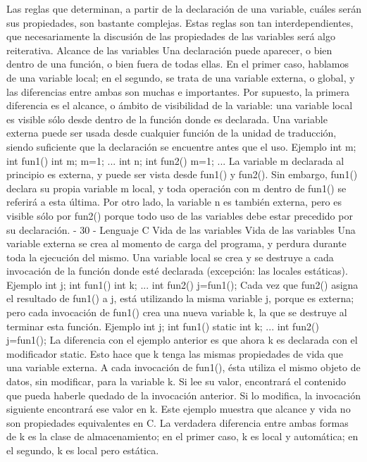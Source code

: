 Las reglas que determinan, a partir de la declaración de una variable, cuáles serán sus propiedades, son
bastante complejas. Estas reglas son tan interdependientes, que necesariamente la discusión de las
propiedades de las variables será algo reiterativa.
Alcance de las variables
Una declaración puede aparecer, o bien dentro de una función, o bien fuera de todas ellas. En el primer
caso, hablamos de una variable local; en el segundo, se trata de una variable externa, o global, y las
diferencias entre ambas son muchas e importantes. Por supuesto, la primera diferencia es el alcance, o
ámbito de visibilidad de la variable: una variable local es visible sólo desde dentro de la función donde
es declarada. Una variable externa puede ser usada desde cualquier función de la unidad de traducción,
siendo suficiente que la declaración se encuentre antes que el uso.
Ejemplo
int m;
int fun1()
{
int m;
m=1;
...
}
int n;
int fun2()
{
m=1;
...
}
La variable m declarada al principio es externa, y puede ser vista desde fun1() y fun2(). Sin embargo,
fun1() declara su propia variable m local, y toda operación con m dentro de fun1() se referirá a esta
última. Por otro lado, la variable n es también externa, pero es visible sólo por fun2() porque todo uso
de las variables debe estar precedido por su declaración.
- 30 -
Lenguaje C
Vida de las variables
Vida de las variables
Una variable externa se crea al momento de carga del programa, y perdura durante toda la ejecución
del mismo. Una variable local se crea y se destruye a cada invocación de la función donde esté
declarada (excepción: las locales estáticas).
Ejemplo
int j;
int fun1()
{
int k;
...
}
int fun2()
{
j=fun1();
}
Cada vez que fun2() asigna el resultado de fun1() a j, está utilizando la misma variable j, porque es
externa; pero cada invocación de fun1() crea una nueva variable k, la que se destruye al terminar esta
función.
Ejemplo
int j;
int fun1()
{
static int k;
...
}
int fun2()
{
j=fun1();
}
La diferencia con el ejemplo anterior es que ahora k es declarada con el modificador static. Esto hace
que k tenga las mismas propiedades de vida que una variable externa. A cada invocación de fun1(),
ésta utiliza el mismo objeto de datos, sin modificar, para la variable k. Si lee su valor, encontrará el
contenido que pueda haberle quedado de la invocación anterior. Si lo modifica, la invocación siguiente
encontrará ese valor en k. Este ejemplo muestra que alcance y vida no son propiedades equivalentes en
C. La verdadera diferencia entre ambas formas de k es la clase de almacenamiento; en el primer caso,
k es local y automática; en el segundo, k es local pero estática.
